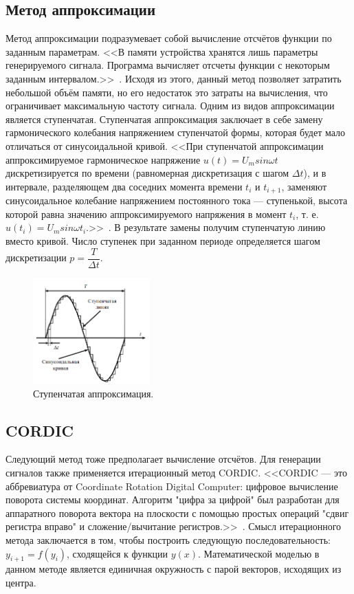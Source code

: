 \subsection{Метод аппроксимации}	
	Метод аппроксимации подразумевает собой вычисление отсчётов функции по заданным параметрам. <<В памяти устройства хранятся лишь параметры генерируемого сигнала. Программа вычисляет отсчеты функции с некоторым заданным интервалом.>>~\cite{leso}. Исходя из этого, данный метод позволяет затратить небольшой объём памяти, но его недостаток это затраты на вычисления, что ограничивает максимальную частоту сигнала. 
	Одним из видов аппроксимации является ступенчатая. Ступенчатая аппроксимация заключает в себе замену гармонического колебания напряжением ступенчатой формы, которая будет мало отличаться от синусоидальной кривой. <<При ступенчатой аппроксимации аппроксимируемое гармоническое напряжение $u(t) = U_{m} sin \omega t$ дискретизируется по времени (равномерная дискретизация с шагом $\Delta t$), и в интервале, разделяющем два соседних момента времени $t_{i}$ и $t_{i+1}$, заменяют синусоидальное колебание напряжением постоянного тока --- ступенькой, высота которой равна значению аппроксимируемого напряжения в момент $t_{i}$, т. е. $u(t_{i}) = U_{m} sin \omega t_{i}$.>>~\cite{metr}. В результате замены получим ступенчатую линию вместо кривой. Число ступенек при заданном периоде определяется шагом дискретизации $p=\dfrac{T}{\Delta t}$.
	
	\begin{figure}[H]
    \centering
    \includegraphics[width=0.4\textwidth]{../image/apr.png}
    \caption{Ступенчатая аппроксимация.}
	\end{figure}
	
\subsection{CORDIC}
	Следующий метод тоже предполагает вычисление отсчётов. Для генерации сигналов также применяется итерационный метод CORDIC. <<CORDIC --- это аббревиатура от Coordinate Rotation Digital Computer: цифровое вычисление поворота системы координат. Алгоритм "цифра за цифрой" был разработан для аппаратного поворота вектора на плоскости с помощью простых операций "сдвиг регистра вправо" и сложение/вычитание регистров.>>~\cite{cordic}. Смысл итерационного метода заключается в том, чтобы построить следующую последовательность: $y_{i+1}=f(y_{i})$, сходящейся к функции $y(x)$. Математической моделью в данном методе является единичная окружность с парой векторов, исходящих из центра.
	
